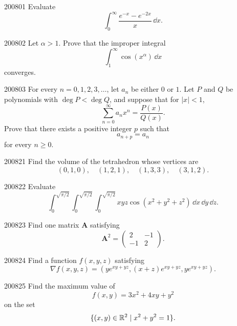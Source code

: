 
\begin{problem}{2008}{0}{1}
Evaluate
\[
    \int_0^{\infty}\frac{e^{-x}-e^{-2x}}{x}\, \dd x.
\]
\end{problem}

\begin{problem}{2008}{0}{2}
Let $\alpha>1$. Prove that the improper integral
\[
    \int_1^{\infty}\cos(x^\alpha)\, \dd x
\]
converges.
\end{problem}

\begin{problem}{2008}{0}{3}
For every $n=0, 1, 2, 3, \dots$, let $a_n$ be either $0$ or $1$. Let $P$ and $Q$ be polynomials with $\deg P<\deg Q$, and suppose that for $|x|<1$,
\[
    \sum_{n=0}^{\infty}a_nx^n=\frac{P(x)}{Q(x)}.
\]
Prove that there exists a positive integer $p$ such that
\[
    a_{n+p}=a_n
\]
for every $n\ge0$.
\end{problem}

\begin{problem}{2008}{2}{1}
Find the volume of the tetrahedron whose vertices are
\[
    (0, 1, 0), \quad(1, 2, 1), \quad(1, 3, 3), \quad(3, 1, 2).
\]
\end{problem}

\begin{problem}{2008}{2}{2}
Evaluate
\[
    \int_0^{\sqrt{\pi/2}}
    \int_0^{\sqrt{\pi/2}}
    \int_0^{\sqrt{\pi/2}}
    xyz\cos(x^2+y^2+z^2)\, \dd x\, \dd y\, \dd z.
\]
\end{problem}

\begin{problem}{2008}{2}{3}
Find one matrix $\mathbf A$ satisfying
\[
    \mathbf A^2=
    \begin{pmatrix}
        2&-1\\
        -1&2
    \end{pmatrix}.
\]
\end{problem}

\begin{problem}{2008}{2}{4}
Find a function $f(x, y, z)$ satisfying
\[
    \nabla f(x, y, z)
    =
    \left(
        ye^{xy+yz},
        (x+z)e^{xy+yz},
        ye^{xy+yz}
    \right).
\]
\end{problem}

\begin{problem}{2008}{2}{5}
Find the maximum value of
\[
    f(x, y)=3x^2+4xy+y^2
\]
on the set
\[
    \{(x, y)\in\mathbb{R}^2\mid x^2+y^2=1\}.
\]
\end{problem}

